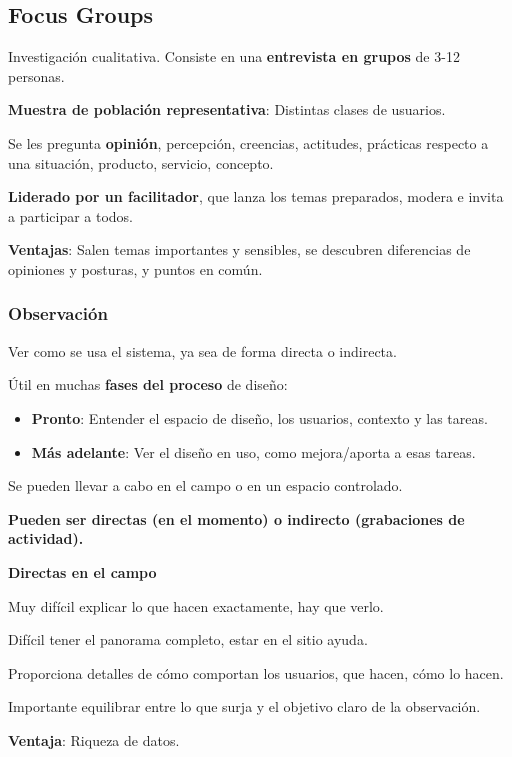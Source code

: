 \documentclass[12pt]{report} %
\begin{document}
\subsection{Focus Groups}

Investigación cualitativa. Consiste en una \textbf{entrevista en grupos}
de 3-12 personas.

\textbf{Muestra de población representativa}: Distintas clases de
usuarios.

Se les pregunta \textbf{opinión}, percepción, creencias, actitudes,
prácticas respecto a una situación, producto, servicio, concepto.

\textbf{Liderado por un facilitador}, que lanza los temas preparados,
modera e invita a participar a todos.

\textbf{Ventajas}: Salen temas importantes y sensibles, se descubren
diferencias de opiniones y posturas, y puntos en común.

\subsubsection{Observación}

Ver como se usa el sistema, ya sea de forma directa o indirecta.

Útil en muchas \textbf{fases del proceso} de diseño:

\begin{itemize}

\item
  \textbf{Pronto}: Entender el espacio de diseño, los usuarios, contexto
  y las tareas.
\item
  \textbf{Más adelante}: Ver el diseño en uso, como mejora/aporta a esas
  tareas.
\end{itemize}

Se pueden llevar a cabo en el campo o en un espacio controlado.

\textbf{Pueden ser directas (en el momento) o indirecto (grabaciones de
actividad).}

\textbf{Directas en el campo}

Muy difícil explicar lo que hacen exactamente, hay que verlo.

Difícil tener el panorama completo, estar en el sitio ayuda.

Proporciona detalles de cómo comportan los usuarios, que hacen, cómo lo
hacen.

Importante equilibrar entre lo que surja y el objetivo claro de la
observación.

\textbf{Ventaja}: Riqueza de datos.
\end{document}
